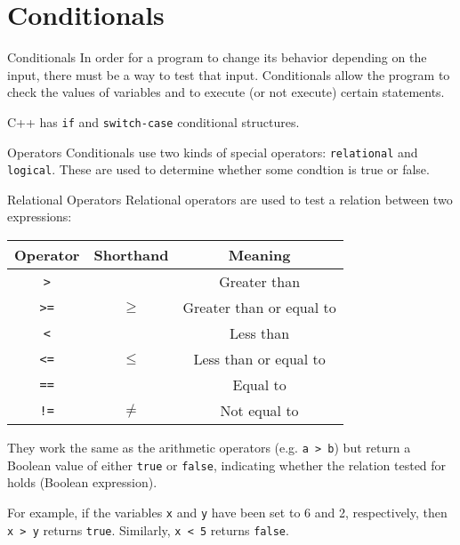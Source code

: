 \documentclass[../lecture3-flowofcontrol.tex]{subfiles}
\begin{document}
\section{Conditionals}


\begin{frame}[fragile]{Conditionals}
    In order for a program to change its behavior depending on the input, there must be a way to test that input. Conditionals allow the program to check the values of variables and to execute (or not execute) certain statements. \newline

    C++ has \texttt{if} and \texttt{switch-case} conditional structures.
\end{frame}


\begin{frame}[fragile]{Operators}
    Conditionals use two kinds of special operators: \texttt{relational} and \texttt{logical}. These are used to determine whether some condtion is true or false.
\end{frame}

\begin{frame}[fragile]{Relational Operators}
    Relational operators are used to test a relation between two expressions:

    \begin{table}
        \center
        \begin{tabular}{c|c|c}
            \toprule
            \textbf{Operator} & \textbf{Shorthand} & \textbf{Meaning} \\
            \midrule
            \verb|>|  &       & Greater than \\
            \verb|>=| & $\ge$ & Greater than or equal to \\
            \verb|<|  &       & Less than \\
            \verb|<=| & $\le$ & Less than or equal to \\
            \verb|==| &       & Equal to \\
            \verb|!=| & $\ne$ & Not equal to \\
            \bottomrule
        \end{tabular}
    \end{table}

    They work the same as the arithmetic operators (e.g. \verb|a > b|) but return a Boolean value of either \texttt{true} or \texttt{false}, indicating whether the relation tested for holds (Boolean expression). \newline

    For example, if the variables \verb|x| and \verb|y| have been set to 6 and 2, respectively, then \verb|x > y| returns \texttt{true}. Similarly, \verb|x < 5| returns \texttt{false}.
\end{frame}
\end{document}
